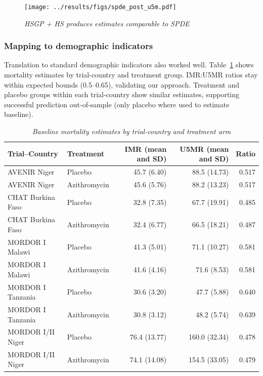 \documentclass[11pt]{article}\usepackage[]{graphicx}\usepackage[]{xcolor}
\begin{document}
\begin{figure}[!h]
\centering
\texttt{[image: ../results/figs/spde\_post\_u5m.pdf]}
\caption{\emph{HSGP + HS produces estimates comparable to SPDE}}
\label{fig:spde-post-u5m}
\end{figure}

\subsubsection{Mapping to demographic indicators}

Translation to standard demographic indicators also worked well. Table~\ref{tab:agedem} shows mortality estimates by trial-country and treatment group. IMR:U5MR ratios stay within expected bounds (0.5--0.65), validating our approach. Treatment and placebo groups within each trial-country show similar estimates, supporting successful prediction out-of-sample (only placebo where used to estimate baseline).

\linespread{1.2}
\begin{table}

\caption{\label{tab:age-decomp-table}\label{tab:agedem}\emph{Baseline mortality estimates by trial-country and treatment arm}}
\centering
\begin{tabular}[t]{llrrr}
\toprule
Trial--Country & Treatment & IMR (mean and SD) & U5MR (mean and SD) & Ratio\\
\midrule
AVENIR Niger & Placebo & 45.7 (6.40) & 88.5 (14.73) & 0.517\\
AVENIR Niger & Azithromycin & 45.6 (5.76) & 88.2 (13.23) & 0.517\\
\midrule
CHAT Burkina Faso & Placebo & 32.8 (7.35) & 67.7 (19.91) & 0.485\\
CHAT Burkina Faso & Azithromycin & 32.4 (6.77) & 66.5 (18.21) & 0.487\\
\midrule
MORDOR I Malawi & Placebo & 41.3 (5.01) & 71.1 (10.27) & 0.581\\
MORDOR I Malawi & Azithromycin & 41.6 (4.16) & 71.6 (8.53) & 0.581\\
\midrule
MORDOR I Tanzania & Placebo & 30.6 (3.20) & 47.7 (5.88) & 0.640\\
MORDOR I Tanzania & Azithromycin & 30.8 (3.12) & 48.2 (5.74) & 0.639\\
\midrule
MORDOR I/II Niger & Placebo & 76.4 (13.77) & 160.0 (32.34) & 0.478\\
MORDOR I/II Niger & Azithromycin & 74.1 (14.08) & 154.5 (33.05) & 0.479\\
\bottomrule
\end{tabular}
\end{table}
\end{document}
